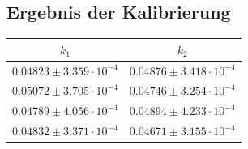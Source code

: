 \documentclass[12pt,a4paper]{article}
\begin{document}
\begin{figure}[H]
	\centering
	\qquad
	\label{}
\end{figure}
\begin{figure}[H]
	\centering
	\qquad
\end{figure}
\newpage
\subsection{Ergebnis der Kalibrierung}
\begin{tabular}{|c|c|}
	\hline 
	$k_1$&$k_2$  \\ 
	\hline 
	$0.04823\pm3.359 \cdot 10^{-4}$ &$0.04876\pm3.418 \cdot 10^{-4}$  \\ 
	\hline 
	$0.05072\pm3.705 \cdot 10^{-4}$ &$0.04746\pm3.254 \cdot 10^{-4}$ \\ 
	\hline 
	$0.04789\pm4.056 \cdot 10^{-4}$ &$0.04894\pm4.233 \cdot 10^{-4}$ \\ 
	\hline 
	$0.04832\pm3.371 \cdot 10^{-4}$ &$0.04671\pm3.155 \cdot 10^{-4}$ \\ 
	\hline 
\end{tabular} 
\end{document}
